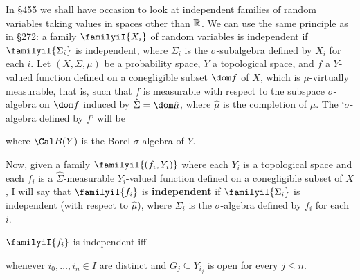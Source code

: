  In \S455 we
shall have occasion to look at independent families of random variables
taking values in spaces other than $\Bbb R$.   We can use the same
principle as in \S272:  a family $\familyiI{X_i}$ of random variables is
independent if $\familyiI{\Sigma_i}$ is independent, where $\Sigma_i$ is
the $\sigma$-subalgebra defined by $X_i$ for each $i$.
Let $(X,\Sigma,\mu)$ be a probability space, $Y$ a
topological space, and $f$ a $Y$-valued
function defined on a conegligible subset $\dom f$ of $X$, which is
$\mu$-virtually measurable, that is, such that $f$ is measurable
with respect to the subspace $\sigma$-algebra on $\dom f$ induced by
$\hat\Sigma=\dom\hat\mu$, where $\hat\mu$ is the completion of $\mu$.
The `$\sigma$-algebra defined by $f$' will be


\noindent where $\Cal B(Y)$ is the Borel $\sigma$-algebra of $Y$.

Now, given a family $\familyiI{(f_i,Y_i)}$ where each $Y_i$ is a
topological space and each $f_i$ is a $\hat\Sigma$-measurable $Y_i$-valued
function defined on a conegligible subset of $X$, I will say that
$\familyiI{f_i}$ is {\bf independent} if $\familyiI{\Sigma_i}$ is
independent (with respect to $\hat\mu$),
where $\Sigma_i$ is the $\sigma$-algebra defined by $f_i$ for
each $i$.

$\familyiI{f_i}$ is independent iff


\noindent whenever $i_0,\ldots,i_n\in I$ are
distinct and $G_j\subseteq Y_{i_j}$ is open for every $j\le n$.

